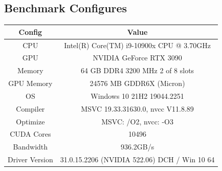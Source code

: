 \documentclass{article}
\begin{document}
    \subsection{Benchmark Configures}
        \begin{table}[h]
        \centering
        \begin{tabular}{@{}c|c@{}}
        \toprule
        Config   & Value   \\ \midrule
        CPU      & Intel(R) Core(TM) i9-10900x CPU @ 3.70GHz \\
        GPU     &  NVIDIA GeForce RTX 3090  \\ 
        Memory   & 64 GB DDR4 3200 MHz 2 of 8 slots   \\
        GPU Memory & 24576 MB GDDR6X (Micron)  \\
        OS       & Windows 10 21H2 19044.2251  \\
        Compiler &  MSVC 19.33.31630.0, nvcc V11.8.89   \\
        Optimize & MSVC: /O2, nvcc: -O3  \\ 
        CUDA Cores   & 10496 \\
        Bandwidth & 936.2GB/s \\
        Driver Version & 31.0.15.2206 (NVIDIA 522.06) DCH / Win 10 64\\
        \bottomrule
        \end{tabular}
        \end{table}
\end{document}
